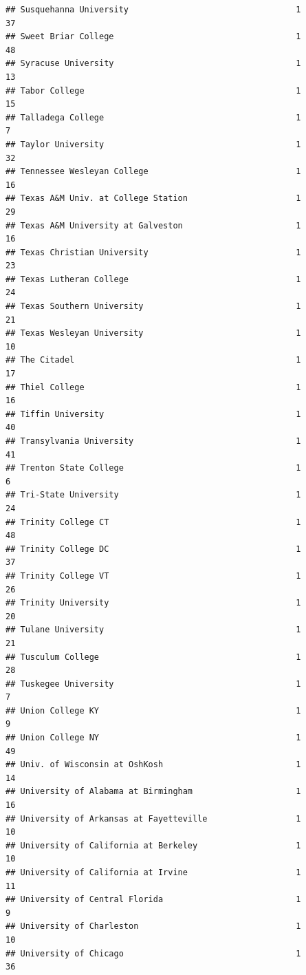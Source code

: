 \documentclass[
]{article}
\begin{document}
\begin{verbatim}
## Susquehanna University                                  1          37
## Sweet Briar College                                     1          48
## Syracuse University                                     1          13
## Tabor College                                           1          15
## Talladega College                                       1           7
## Taylor University                                       1          32
## Tennessee Wesleyan College                              1          16
## Texas A&M Univ. at College Station                      1          29
## Texas A&M University at Galveston                       1          16
## Texas Christian University                              1          23
## Texas Lutheran College                                  1          24
## Texas Southern University                               1          21
## Texas Wesleyan University                               1          10
## The Citadel                                             1          17
## Thiel College                                           1          16
## Tiffin University                                       1          40
## Transylvania University                                 1          41
## Trenton State College                                   1           6
## Tri-State University                                    1          24
## Trinity College CT                                      1          48
## Trinity College DC                                      1          37
## Trinity College VT                                      1          26
## Trinity University                                      1          20
## Tulane University                                       1          21
## Tusculum College                                        1          28
## Tuskegee University                                     1           7
## Union College KY                                        1           9
## Union College NY                                        1          49
## Univ. of Wisconsin at OshKosh                           1          14
## University of Alabama at Birmingham                     1          16
## University of Arkansas at Fayetteville                  1          10
## University of California at Berkeley                    1          10
## University of California at Irvine                      1          11
## University of Central Florida                           1           9
## University of Charleston                                1          10
## University of Chicago                                   1          36

\end{verbatim}
\end{document}
